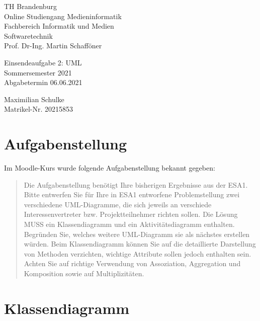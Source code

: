 \documentclass{article}
\begin{document}
\begin{titlepage}
	\begin{flushleft}
		TH Brandenburg \\
		Online Studiengang Medieninformatik \\
		Fachbereich Informatik und Medien \\
		Softwaretechnik \\
		Prof. Dr-Ing. Martin Schafföner
	\end{flushleft}

	\vfill

	\begin{center}
		\Large{Einsendeaufgabe 2: UML}\\[0.5em]
		\large{Sommersemester 2021}\\[0.25em]
		\large{Abgabetermin 06.06.2021}
	\end{center}

	\vfill

	\begin{flushright}
		Maximilian Schulke \\
		Matrikel-Nr. 20215853
	\end{flushright}
\end{titlepage}

\tableofcontents

\vfill

\section{Aufgabenstellung}

Im Moodle-Kurs wurde folgende Aufgabenstellung bekannt gegeben:

\begin{quote}
	Die Aufgabenstellung benötigt Ihre bisherigen Ergebnisse aus der ESA1.
	Bitte entwerfen Sie für Ihre in ESA1 entworfene Problemstellung zwei
	verschiedene UML-Diagramme, die sich jeweils an verschiede
	Interessenvertreter bzw. Projektteilnehmer richten sollen. Die Lösung MUSS
	ein Klassendiagramm und ein Aktivitätsdiagramm enthalten. Begründen Sie,
	welches weitere UML-Diagramm sie als nächstes erstellen würden. Beim
	Klassendiagramm können Sie auf die detaillierte Darstellung von Methoden
	verzichten, wichtige Attribute sollen jedoch enthalten sein. Achten Sie auf
	richtige Verwendung von Assoziation, Aggregation und Komposition sowie auf
	Multiplizitäten.
\end{quote}

\newpage

\section{Klassendiagramm}
\end{document}
